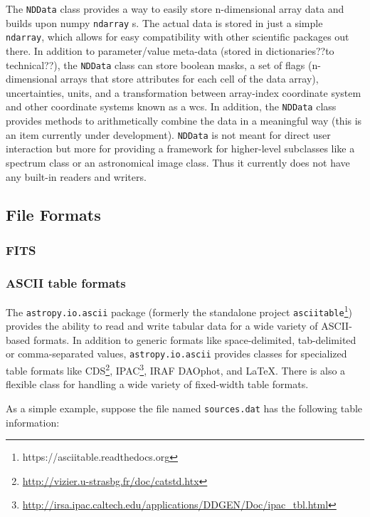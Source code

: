 \documentclass[traditabstract]{aa}
\begin{document}
The \texttt{NDData} class provides a way to easily store n-dimensional array data and builds upon \gls{numpy} \texttt{ndarray} s. The actual data is stored in just a simple \texttt{ndarray}, which allows for easy compatibility with other scientific packages out there. 
In addition to parameter/value meta-data (stored in dictionaries??to technical??), the \texttt{NDData} class can store boolean masks,
a set of flags (n-dimensional arrays that store attributes for each cell of the data array), uncertainties, units, 
and a transformation between array-index coordinate system and other coordinate systems known as a \gls{wcs}. 
In addition, the \texttt{NDData} class provides methods to arithmetically combine the data in a meaningful way (this is an item currently under development). 
\texttt{NDData} is not meant for direct user interaction but more for providing a framework for higher-level subclasses like a spectrum class or an astronomical image class. Thus it currently does not have any built-in readers and writers. 

\subsection{File Formats}


\subsubsection{FITS}



\subsubsection{ASCII table formats}
\label{sec:ascii}

The \texttt{astropy.io.ascii} package (formerly the standalone project
\texttt{asciitable}\footnote{https://asciitable.readthedocs.org}) provides the
ability to read and write tabular data for a wide variety of ASCII-based
formats.  In addition to generic formats like space-delimited, tab-delimited or
comma-separated values, \texttt{astropy.io.ascii} provides classes for specialized
table formats like
CDS\footnote{\url{http://vizier.u-strasbg.fr/doc/catstd.htx}},
IPAC\footnote{\url{http://irsa.ipac.caltech.edu/applications/DDGEN/Doc/ipac_tbl.html}},
IRAF DAOphot, and LaTeX.  There is also a flexible class for handling
a wide variety of fixed-width table formats.

As a simple example, suppose the file named \verb|sources.dat| has the following
table information:
\end{document}

